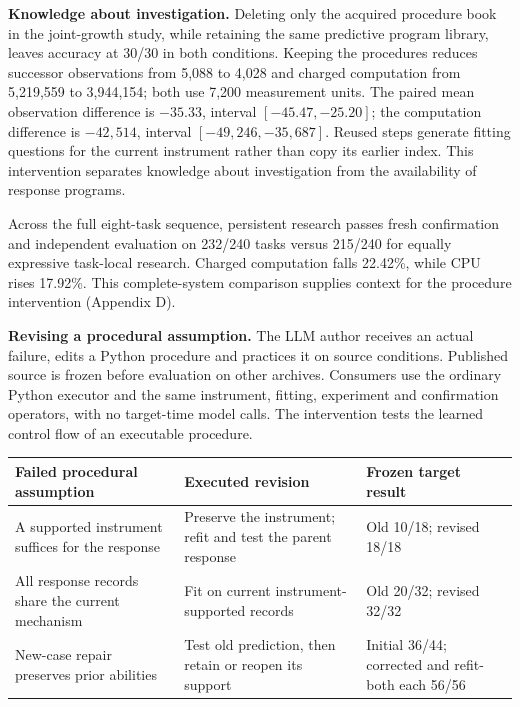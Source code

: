 \documentclass[twoside,11pt]{article}
\begin{document}
\textbf{Knowledge about investigation.} Deleting only the acquired procedure book in the joint-growth study, while retaining the same predictive program library, leaves accuracy at 30/30 in both conditions. Keeping the procedures reduces successor observations from 5,088 to 4,028 and charged computation from 5,219,559 to 3,944,154; both use 7,200 measurement units. The paired mean observation difference is \(-35.33\), interval \([-45.47,-25.20]\); the computation difference is \(-42{,}514\), interval \([-49{,}246,-35{,}687]\). Reused steps generate fitting questions for the current instrument rather than copy its earlier index. This intervention separates knowledge about investigation from the availability of response programs.


Across the full eight-task sequence, persistent research passes fresh confirmation and independent evaluation on 232/240 tasks versus 215/240 for equally expressive task-local research. Charged computation falls 22.42\%, while CPU rises 17.92\%. This complete-system comparison supplies context for the procedure intervention (Appendix D).


\textbf{Revising a procedural assumption.} The LLM author receives an actual failure, edits a Python procedure and practices it on source conditions. Published source is frozen before evaluation on other archives. Consumers use the ordinary  Python executor and the same instrument, fitting, experiment and confirmation operators, with no target-time model calls. The intervention tests the learned control flow of an executable procedure.


\begingroup\small\setlength{\tabcolsep}{4pt}
\renewcommand{\arraystretch}{1.18}
\par\addvspace{.7em}\noindent\begin{minipage}{\linewidth}
\begin{tabular}{@{}>{\raggedright\arraybackslash}p{}>{\raggedright\arraybackslash}p{}>{\raggedright\arraybackslash}p{}@{}}
\toprule
\textbf{Failed procedural assumption} & \textbf{Executed revision} & \textbf{Frozen target result} \\
\midrule
A supported instrument suffices for the response & Preserve the instrument; refit and test the parent response & Old 10/18; revised 18/18 \\
All response records share the current mechanism & Fit on current instrument-supported records & Old 20/32; revised 32/32 \\
New-case repair preserves prior abilities & Test old prediction, then retain or reopen its support & Initial 36/44; corrected and refit-both each 56/56 \\
\bottomrule
\end{tabular}
\end{minipage}\par\addvspace{.7em}
\endgroup
\end{document}
